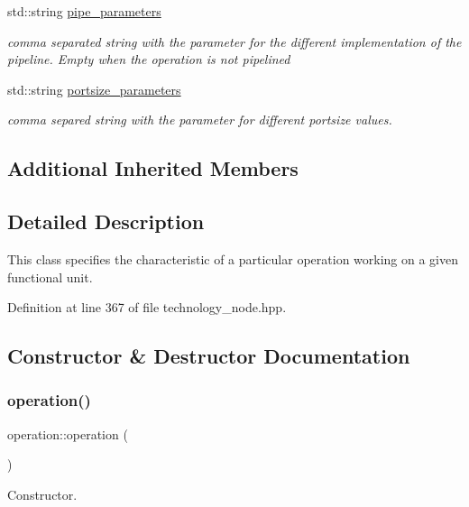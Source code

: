 \begin{DoxyCompactItemize}
std\+::string \hyperlink{structoperation_ab5eaece9cc865e43adaa75df83b5b4f3}{pipe\+\_\+parameters}
\begin{DoxyCompactList}\small\item\em comma separated string with the parameter for the different implementation of the pipeline. Empty when the operation is not pipelined \end{DoxyCompactList}\item 
std\+::string \hyperlink{structoperation_a235782b551778467d671ee29d19407ee}{portsize\+\_\+parameters}
\begin{DoxyCompactList}\small\item\em comma separed string with the parameter for different portsize values. \end{DoxyCompactList}\end{DoxyCompactItemize}
\subsection*{Additional Inherited Members}


\subsection{Detailed Description}
This class specifies the characteristic of a particular operation working on a given functional unit. 

Definition at line 367 of file technology\+\_\+node.\+hpp.



\subsection{Constructor \& Destructor Documentation}
\mbox{\label{structoperation_ad4625adf0914d5c4dd25b1710703b642}} 
\subsubsection{\texorpdfstring{operation()}{operation()}}
{\footnotesize\ttfamily operation\+::operation (\begin{DoxyParamCaption}{ }\end{DoxyParamCaption})}



Constructor. 



